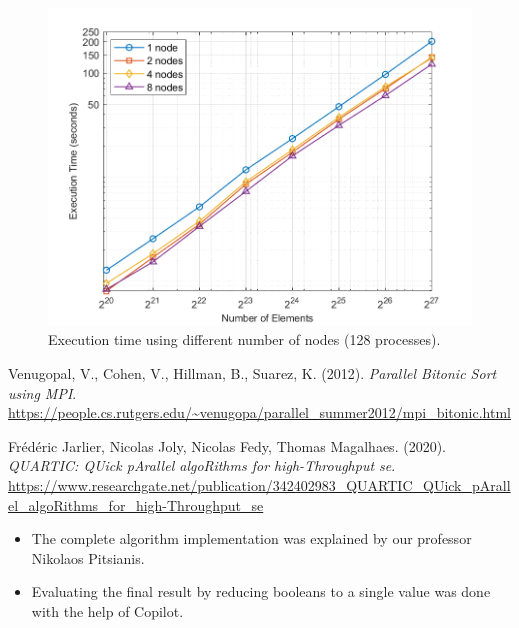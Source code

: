 \documentclass{article}
\begin{document}
\begin{figure}[h!]
    \centering
    \includegraphics[width=1\linewidth]{execution_time_vs_elements.png}
    \caption{Execution time using different number of nodes (128 processes).}
    \label{fig:proc vs nodes}
\end{figure}

\newpage
\begin{thebibliography}{9}
Venugopal, V., Cohen, V., Hillman, B., Suarez, K. (2012). \textit{Parallel Bitonic Sort using MPI}. \url{https://people.cs.rutgers.edu/~venugopa/parallel_summer2012/mpi_bitonic.html}

Frédéric Jarlier, Nicolas Joly, Nicolas Fedy, Thomas Magalhaes. (2020). \textit{QUARTIC: QUick pArallel algoRithms for high-Throughput se}. \url{https://www.researchgate.net/publication/342402983_QUARTIC_QUick_pArallel_algoRithms_for_high-Throughput_se}

\end{thebibliography}

\begin{itemize}
    \item The complete algorithm implementation was explained by our professor Nikolaos Pitsianis.
    \item Evaluating the final result by reducing booleans to a single value was done with the help of Copilot.
\end{itemize}
\end{document}
